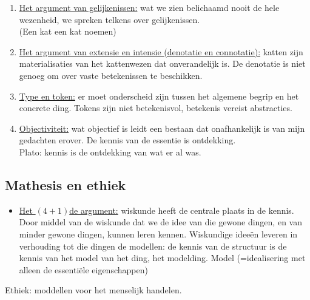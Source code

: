\documentclass[11pt,a4paper]{article}
\begin{document}
\begin{enumerate}
\item \underline{Het argument van gelijkenissen:} wat we zien belichaamd nooit de hele wezenheid, we spreken telkens over gelijkenissen.
\\
(Een kat een kat noemen)
\item \underline{Het argument van extensie en intensie (denotatie en connotatie):} katten zijn materialisaties van het kattenwezen dat onverandelijk is. De denotatie is niet genoeg om over vaste betekenissen te beschikken.
\item \underline{Type en token:} er moet onderscheid zijn tussen het algemene begrip en het concrete ding. Tokens zijn niet betekenisvol, betekenis vereist abstracties.
\item \underline{Objectiviteit:} wat objectief is leidt een bestaan dat onafhankelijk is van mijn gedachten erover. De kennis van de essentie is ontdekking.
\\
Plato: kennis is de ontdekking van wat er al was.
\end{enumerate}
\subsection{Mathesis en ethiek}
\begin{itemize}
\item \underline{Het $(4+1)$de argument:}
wiskunde heeft de centrale plaats in de kennis.
Door middel van de wiskunde dat we de idee van die gewone dingen, en van minder gewone dingen, kunnen leren kennen.
Wiskundige ideeën leveren in verhouding tot die dingen de modellen: de kennis van de structuur is de kennis van het model van het ding, het modelding.  Model (=idealisering met alleen de essentiële eigenschappen)
\end{itemize}
Ethiek: moddellen voor het menselijk handelen.
\end{document}
